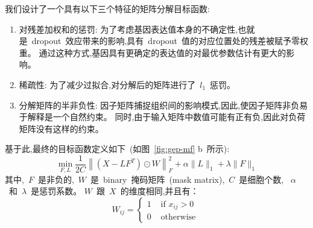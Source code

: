 我们设计了一个具有以下三个特征的矩阵分解目标函数: 
\begin{enumerate}
    \item 对残差加权和的惩罚: 为了考虑基因表达值本身的不确定性,也就是~dropout~效应带来的影响,具有~dropout~值的对应位置处的残差被赋予零权重。
          通过这种方式,基因具有更确定的表达值的对最优参数估计有更大的影响。
    \item 稀疏性: 为了减少过拟合,对分解后的矩阵进行了~$l_1$~惩罚。
    \item 分解矩阵的半非负性: 因子矩阵捕捉组织间的影响模式,因此,使因子矩阵非负易于解释是一个自然约束。
          同时,由于输入矩阵中数值可能有正有负,因此对负荷矩阵没有这样的约束。
\end{enumerate}
基于此,最终的目标函数定义如下~(如图~\ref{fig:gep-mf} b~所示):
\begin{equation}
    \label{eq:obj}
    \min _{F, L} \frac{1}{2 C}\left\|\left(X-L F^{T}\right) \odot W\right\|_{F}^{2}+\alpha\|L\|_{1}+\lambda\|F\|_{1}
\end{equation}
其中,~$F$~是非负的,~$W$~是~binary~掩码矩阵~(mask matrix),~$C$~是细胞个数,
~$\alpha$~和~$\lambda$~是惩罚系数。
$W$~跟~$X$~的维度相同,并且有：
\begin{equation}
    W_{i j}=\left\{\begin{array}{ll}1 & \text { if } x_{i j}>0 \\ 0 & \text { otherwise }\end{array}\right.
\end{equation}

